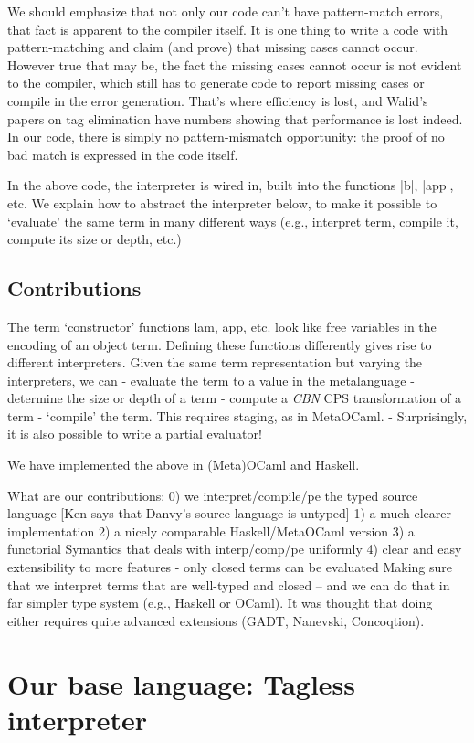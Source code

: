 \documentclass[preprint]{sigplanconf}
\begin{document}
We should emphasize that not only our code can't have pattern-match
errors, that fact is apparent to the compiler itself. It is one thing
to write a code with pattern-matching and claim (and prove) that
missing cases cannot occur. However true that may be, the fact the
missing cases cannot occur is not evident to the compiler, which still
has to generate code to report missing cases or compile in the error
generation. That's where efficiency is lost, and Walid's papers on tag
elimination have numbers showing that performance is lost indeed. 
In our code, there is simply no pattern-mismatch opportunity: the
proof of no bad match is expressed in the code itself. 


In the above code, the interpreter is wired in, built into the
functions |b|, |app|, etc. We explain how to abstract the interpreter
below, to make it possible to `evaluate' the same term in many different
ways (e.g., interpret term, compile it, compute its size or depth,
etc.)

\subsection{Contributions}
The term `constructor' functions lam, app, etc. look like free
variables in the encoding of an object term.  Defining these functions
differently gives rise to different interpreters.  Given the same term
representation but varying the interpreters, we can
	- evaluate the term to a value in the metalanguage
	- determine the size or depth of a term
        - compute a \emph{CBN} CPS transformation of a term
	- `compile' the term. This requires staging, as in MetaOCaml.
	- Surprisingly, it is also possible to write a partial
	evaluator! 

We have implemented the above in (Meta)OCaml and Haskell.

What are our contributions:
0) we interpret/compile/pe the typed source language
   [Ken says that Danvy's source language is untyped]
1) a much clearer implementation
2) a nicely comparable Haskell/MetaOCaml version
3) a functorial Symantics that deals with interp/comp/pe uniformly
4) clear and easy extensibility to more features
- only closed terms can be evaluated
Making sure that we interpret terms that are well-typed and closed --
and we can do that in far simpler type system (e.g., Haskell or
OCaml). It was thought that doing either requires quite advanced
extensions (GADT, Nanevski, Concoqtion).


\section{Our base language: Tagless interpreter}
\end{document}
